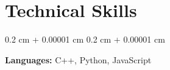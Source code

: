 \documentclass[10pt, a4paper]{article}
\newenvironment{onecolentry}{
    \begin{adjustwidth}{
        0.2 cm + 0.00001 cm
    }{
        0.2 cm + 0.00001 cm
    }
}{
    \end{adjustwidth}
} %
\begin{document}




    
    \section{Technical Skills}
        \begin{onecolentry}
            \textbf{Languages:} C++, Python, JavaScript
        \end{onecolentry}

\end{document}
